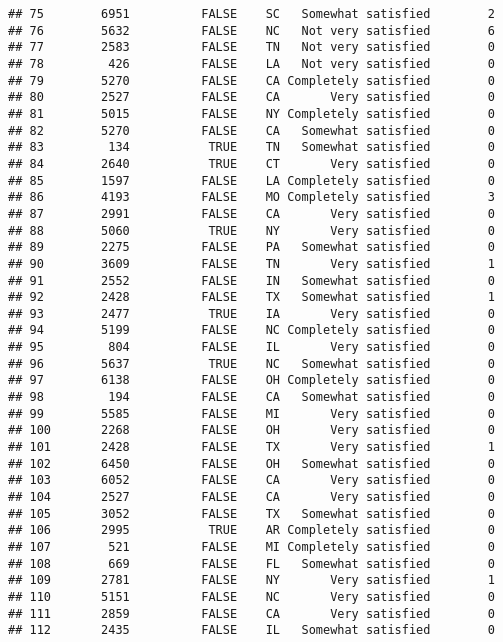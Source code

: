 \documentclass[]{book}
\theoremstyle{definition}
\theoremstyle{definition}
\theoremstyle{remark}
\begin{document}
\begin{verbatim}
## 75        6951          FALSE    SC   Somewhat satisfied        2
## 76        5632          FALSE    NC   Not very satisfied        6
## 77        2583          FALSE    TN   Not very satisfied        0
## 78         426          FALSE    LA   Not very satisfied        0
## 79        5270          FALSE    CA Completely satisfied        0
## 80        2527          FALSE    CA       Very satisfied        0
## 81        5015          FALSE    NY Completely satisfied        0
## 82        5270          FALSE    CA   Somewhat satisfied        0
## 83         134           TRUE    TN   Somewhat satisfied        0
## 84        2640           TRUE    CT       Very satisfied        0
## 85        1597          FALSE    LA Completely satisfied        0
## 86        4193          FALSE    MO Completely satisfied        3
## 87        2991          FALSE    CA       Very satisfied        0
## 88        5060           TRUE    NY       Very satisfied        0
## 89        2275          FALSE    PA   Somewhat satisfied        0
## 90        3609          FALSE    TN       Very satisfied        1
## 91        2552          FALSE    IN   Somewhat satisfied        0
## 92        2428          FALSE    TX   Somewhat satisfied        1
## 93        2477           TRUE    IA       Very satisfied        0
## 94        5199          FALSE    NC Completely satisfied        0
## 95         804          FALSE    IL       Very satisfied        0
## 96        5637           TRUE    NC   Somewhat satisfied        0
## 97        6138          FALSE    OH Completely satisfied        0
## 98         194          FALSE    CA   Somewhat satisfied        0
## 99        5585          FALSE    MI       Very satisfied        0
## 100       2268          FALSE    OH       Very satisfied        0
## 101       2428          FALSE    TX       Very satisfied        1
## 102       6450          FALSE    OH   Somewhat satisfied        0
## 103       6052          FALSE    CA       Very satisfied        0
## 104       2527          FALSE    CA       Very satisfied        0
## 105       3052          FALSE    TX   Somewhat satisfied        0
## 106       2995           TRUE    AR Completely satisfied        0
## 107        521          FALSE    MI Completely satisfied        0
## 108        669          FALSE    FL   Somewhat satisfied        0
## 109       2781          FALSE    NY       Very satisfied        1
## 110       5151          FALSE    NC       Very satisfied        0
## 111       2859          FALSE    CA       Very satisfied        0
## 112       2435          FALSE    IL   Somewhat satisfied        0

\end{verbatim}
\end{document}
